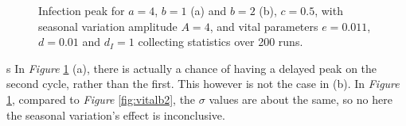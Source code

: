\begin{figure}[H]
    \centering
    \caption{Infection peak for $a=4$, $b=1$ (a) and $b=2$ (b), $c=0.5$, with seasonal variation amplitude $A = 4$, and vital parameters $e=0.011$, $d=0.01$ and $d_I=1$ collecting statistics over 200 runs.}
    \label{fig:seasonalI_peak}
\end{figure}s
In \textit{Figure} \ref{fig:seasonalI_peak} (a), there is actually a chance of having a delayed peak on the second cycle, rather than the first.
This however is not the case in (b). In \textit{Figure} \ref{fig:seasonalI_peak}, compared to \textit{Figure} \ref{fig:vitalb2}, the $\sigma$ values are about the same, so no here the seasonal variation's effect is inconclusive.

